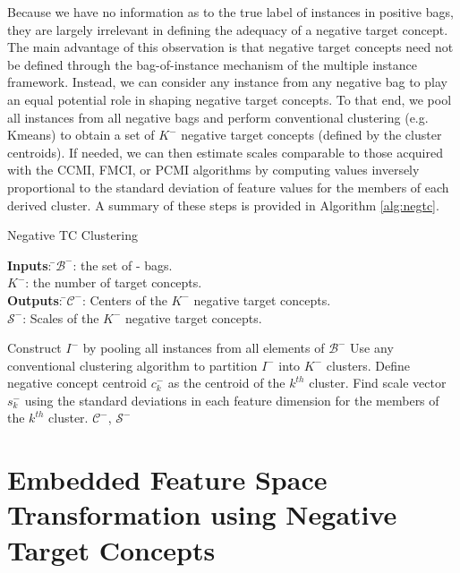 \documentclass[12pt,dvips]{report}
\numberwithin{equation}{section}
\begin{document}
Because we have no information as to the true label of instances in positive bags, they are largely irrelevant in defining the adequacy of a negative target concept.  The main advantage of this observation is that negative target concepts need not be defined through the bag-of-instance mechanism of the multiple instance framework.  Instead, we can consider any instance from any negative bag to play an equal potential role in shaping negative target concepts.  To that end, we pool all instances from all negative bags and perform conventional clustering (e.g. Kmeans) to obtain a set of $K^{-}$ negative target concepts (defined by the cluster centroids).  If needed, we can then estimate scales comparable to those acquired with the CCMI, FMCI, or PCMI algorithms by computing values inversely proportional to the standard deviation of feature values for the members of each derived cluster.  A summary of these steps is provided in Algorithm \ref{alg:negtc}.

\begin{algorithm}
  \caption{Negative TC Clustering}
  \label{alg:negtc}
  {\begin{tabbing}
  \textbf{Inputs}: \=$\mathcal{B}^-$: the set of - bags.\\
   \>$K^{-}$: the number of target concepts.\\
   \textbf{Outputs}: \=$\mathcal{C}^-$: Centers of the $K^{-}$ negative target concepts.\\
     \>$\mathcal{S}^-$: Scales of the $K^{-}$ negative target concepts.\\
   \end{tabbing}}
  \begin{algorithmic}
    \STATE Construct $I^{-}$ by pooling all instances from all elements of $\mathcal{B}^-$
    \STATE Use any conventional clustering algorithm to partition $I^-$ into $K^-$ clusters.      
       \STATE Define negative concept centroid $c^{-}_{k}$ as the centroid of the $k^{th}$ cluster.
       \STATE Find scale vector $s^{-}_{k}$ using the standard deviations in each feature dimension for the members of the $k^{th}$ cluster.
       \ENDFOR
    \RETURN $\mathcal{C}^{-}$, $\mathcal{S}^{-}$
  \end{algorithmic}
\end{algorithm}

\section{Embedded Feature Space Transformation using Negative Target Concepts} %
\end{document}
